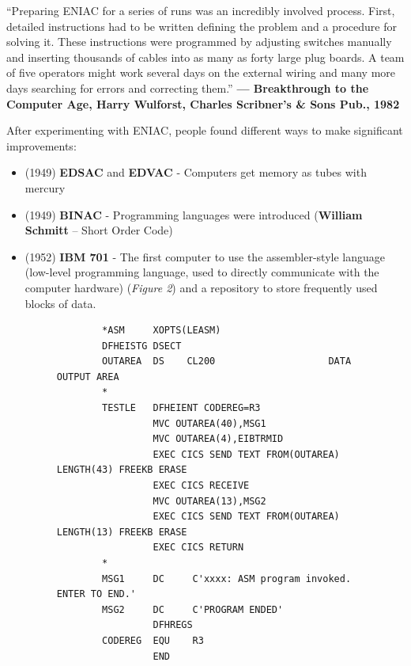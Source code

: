 \documentclass[12pt]{article}
\begin{document}
\begin{center}
    \footnotesize“Preparing ENIAC for a series of runs was an incredibly involved process. First, detailed instructions had to be written defining the problem and a procedure for solving it. These instructions were programmed by adjusting switches manually and inserting thousands of cables into as many as forty large plug boards. A team of five operators might work several days on the external wiring and many more days searching for errors and correcting them.”\textbf{ — Breakthrough to the Computer Age, Harry Wulforst, Charles Scribner’s \& Sons Pub., 1982}
\end{center}

\noindent After experimenting with ENIAC, people found different ways to make significant improvements:
\begin{itemize}
    \item (1949) \textbf{EDSAC} and \textbf{EDVAC} - Computers get memory as tubes with mercury
    \item (1949) \textbf{BINAC} - Programming languages were introduced (\textbf{William Schmitt} – Short Order Code)
    \item (1952) \textbf{IBM 701} - The first computer to use the assembler-style language (low-level programming language, used to directly communicate with the computer hardware) (\textit{Figure 2}) and a repository to store frequently used blocks of data.
          \begin{figure}[H]
              \centering
              \begin{verbatim}
        *ASM     XOPTS(LEASM)
        DFHEISTG DSECT
        OUTAREA  DS    CL200                    DATA OUTPUT AREA
        *
        TESTLE   DFHEIENT CODEREG=R3
                 MVC OUTAREA(40),MSG1
                 MVC OUTAREA(4),EIBTRMID
                 EXEC CICS SEND TEXT FROM(OUTAREA) LENGTH(43) FREEKB ERASE
                 EXEC CICS RECEIVE
                 MVC OUTAREA(13),MSG2
                 EXEC CICS SEND TEXT FROM(OUTAREA) LENGTH(13) FREEKB ERASE
                 EXEC CICS RETURN
        *
        MSG1     DC     C'xxxx: ASM program invoked. ENTER TO END.'
        MSG2     DC     C'PROGRAM ENDED'
                 DFHREGS
        CODEREG  EQU    R3
                 END

\end{verbatim}
\end{figure}
\end{itemize}
\end{document}
